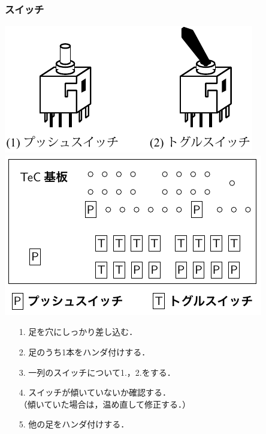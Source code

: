 \documentclass[handout]{beamer}        %
\begin{document}
\begin{frame}
  \frametitle{スイッチ}
  \vfill
  \centerline{\includegraphics[scale=0.65]{../chap3/sw.pdf}\hspace{1cm}
    \includegraphics[scale=0.8]{../Tikz/sws.pdf}}
  \vfill
  \begin{enumerate}
  \item[1.] 足を穴にしっかり差し込む．
  \item[2.] 足のうち1本をハンダ付けする．
  \item[3.] 一列のスイッチについて1.，2.をする．
  \item[4.] スイッチが傾いていないか確認する．\\
    （傾いていた場合は，温め直して修正する．）
  \item[5.] 他の足をハンダ付けする．
  \end{enumerate}
  \vfill
\end{frame}
\end{document}
